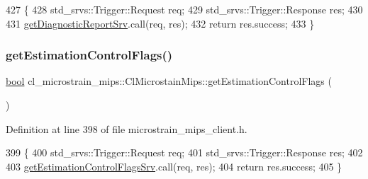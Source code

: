 \begin{DoxyCode}
427     \{
428         std\_srvs::Trigger::Request req;
429         std\_srvs::Trigger::Response res;
430 
431         \hyperlink{classcl__microstrain__mips_1_1ClMicrostainMips_a3d4329c798aa4b7cab1320f35f270192}{getDiagnosticReportSrv}.call(req, res);
432         \textcolor{keywordflow}{return} res.success;
433     \}
\end{DoxyCode}
\mbox{\label{classcl__microstrain__mips_1_1ClMicrostainMips_ad0a8eda5c19617250d3392593d0c8986}} 
\subsubsection{\texorpdfstring{get\+Estimation\+Control\+Flags()}{getEstimationControlFlags()}}
{\footnotesize\ttfamily \hyperlink{classbool}{bool} cl\+\_\+microstrain\+\_\+mips\+::\+Cl\+Microstain\+Mips\+::get\+Estimation\+Control\+Flags (\begin{DoxyParamCaption}{ }\end{DoxyParamCaption})\hspace{0.3cm}{\ttfamily [inline]}}



Definition at line 398 of file microstrain\+\_\+mips\+\_\+client.\+h.


\begin{DoxyCode}
399     \{
400         std\_srvs::Trigger::Request req;
401         std\_srvs::Trigger::Response res;
402 
403         \hyperlink{classcl__microstrain__mips_1_1ClMicrostainMips_a64039ee26cf8a290b3c22b787b8868a5}{getEstimationControlFlagsSrv}.call(req, res);
404         \textcolor{keywordflow}{return} res.success;
405     \}
\end{DoxyCode}
\mbox{\label{classcl__microstrain__mips_1_1ClMicrostainMips_a3a0425423b14461be52bc9b6c0f118bc}} 
